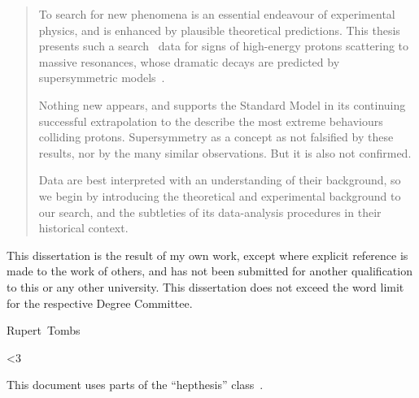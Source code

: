 
\begin{abstract}
To search for new phenomena is an essential endeavour of experimental physics,
and is enhanced by plausible theoretical predictions.
This thesis presents such a search \atlas\ data for signs of high-energy
protons scattering to massive resonances, whose dramatic decays are
predicted by supersymmetric models~\cite{atlas2022searches}.

Nothing new appears, and supports the Standard Model in its continuing
successful extrapolation to the describe the most extreme behaviours colliding
protons.
Supersymmetry as a concept as not falsified by these results,
nor by the many similar observations.
But it is also not confirmed.

Data are best interpreted with an understanding of their background, so we
begin by introducing the theoretical and experimental background to our search,
and the subtleties of its data-analysis procedures in their historical context.
\end{abstract}


\begin{declaration}
\noindent
This dissertation is the result of my own work, except where explicit
reference is made to the work of others, and has not been submitted
for another qualification to this or any other university.
This dissertation does not exceed the word limit for the respective
Degree Committee.
\vspace*{1cm}
\begin{flushright}
Rupert~Tombs
\end{flushright}
\end{declaration}


\begin{acknowledgements}
<3




This document uses parts of the ``hepthesis'' class~\cite{hepthesis}.
\end{acknowledgements}


